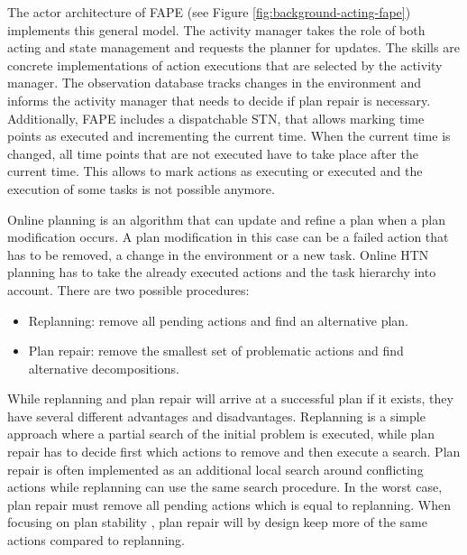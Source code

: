The actor architecture of \ac{FAPE} (see Figure \ref{fig:background-acting-fape}) implements this general model.
The activity manager takes the role of both acting and state management and requests the planner for updates.
The skills are concrete implementations of action executions that are selected by the activity manager.
The observation database tracks changes in the environment and informs the activity manager that needs to decide if plan repair is necessary.
Additionally, \ac{FAPE} includes a dispatchable \ac{STN}, that allows marking time points as executed and incrementing the current time.
When the current time is changed, all time points that are not executed have to take place after the current time.
This allows to mark actions as executing or executed and the execution of some tasks is not possible anymore.




Online planning \citep[sec.~2.6.2]{ghallabAutomatedPlanningActing2016} is an algorithm that can update and refine a plan when a plan modification occurs.
A plan modification in this case can be a failed action that has to be removed, a change in the environment or a new task.
Online \ac{HTN} planning \citep{dvorakPlanningActingTemporal2014} has to take the already executed actions and the task hierarchy into account.
There are two possible procedures:
\begin{itemize}
  \item Replanning: remove all pending actions and find an alternative plan.
  \item Plan repair: remove the smallest set of problematic actions and find alternative decompositions.
\end{itemize}

While replanning and plan repair will arrive at a successful plan if it exists, they have several different advantages and disadvantages.
Replanning is a simple approach where a partial search of the initial problem is executed, while plan repair has to decide first which actions to remove and then execute a search.
Plan repair is often implemented as an additional local search around conflicting actions \citep{bajadaTemporalPlanQuality2014} while replanning can use the same search procedure.
In the worst case, plan repair must remove all pending actions which is equal to replanning.
When focusing on plan stability \citep{foxPlanStabilityReplanning2006}, plan repair will by design keep more of the same actions compared to replanning.

